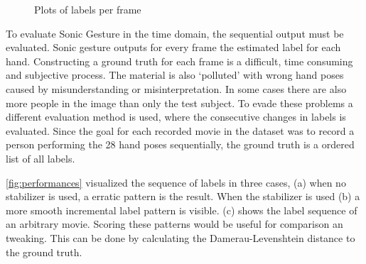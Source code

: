 \begin{figure}[tb]
\center{}
\hspace{0.02\linewidth}
\hspace{0.02\linewidth}
\caption{Plots of labels per frame}
\label{fig:performances}
\end{figure}

To evaluate Sonic Gesture in the time domain, the sequential output must be evaluated. Sonic gesture outputs for every frame the estimated label for each hand. Constructing a ground truth for each frame is a difficult, time consuming and subjective process. The material is also `polluted' with wrong hand poses caused by misunderstanding or misinterpretation. In some cases there are also more people in the image than only the test subject. To evade these problems a different evaluation method is used, where the consecutive changes in labels is evaluated. Since the goal for each recorded movie in the dataset was to record a person performing the 28 hand poses sequentially, the ground truth is a ordered list of all labels.

\autoref{fig:performances} visualized the sequence of labels in three cases, (a) when no stabilizer is used, a erratic pattern is the result. When the stabilizer is used (b) a more smooth incremental label pattern is visible. (c) shows the label sequence of an arbitrary movie. Scoring these patterns would be useful for comparison an tweaking. This can be done by calculating the Damerau-Levenshtein distance to the ground truth.

